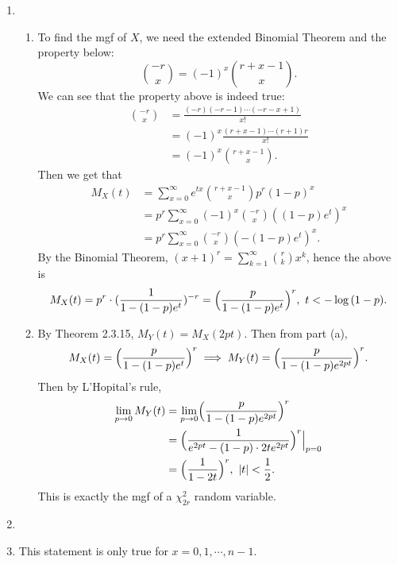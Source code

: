 \documentclass{article}
\begin{document}
\begin{enumerate}
    \item \begin{enumerate}
        \item To find the mgf of $X$, we need the extended Binomial Theorem and the property below: 
        \[ \binom{-r}{x} = (-1)^x \binom{r + x - 1}{x}. \]
        We can see that the property above is indeed true: 
        \begin{align*}
            \binom{-r}{x} 
            &= \frac{(-r)(-r-1)\cdots(-r - x + 1)}{x!} \\
            &= (-1)^x \frac{(r + x - 1)\cdots(r + 1)r}{x!} \\
            &= (-1)^x \binom{r + x - 1}{x}.
        \end{align*}
        Then we get that 
        \begin{align*}
            M_X(t) 
            &= \sum_{x = 0}^{\infty} e^{tx} \binom{r + x - 1}{x} p^r (1 - p)^x \\
            &= p^r \sum_{x = 0}^{\infty} (-1)^x \binom{-r}{x} ((1 - p)e^t)^x \\
            &= p^r \sum_{x = 0}^{\infty} \binom{-r}{x} (-(1 - p)e^t)^x.
        \end{align*}
        By the Binomial Theorem, $(x + 1)^r = \sum_{k = 1}^{\infty} \binom{r}{k} x^k$, hence the above is 
        \[ M_X(t) = p^r \cdot (\frac{1}{1 - (1 - p)e^t})^{-r} 
        = \Bigl( \frac{p}{1 - (1 - p)e^t} \Bigr)^r, \ t < -\log{(1 - p)}. \]

        \item By Theorem 2.3.15, $M_Y(t) = M_X(2pt)$. Then from part (a), 
        \[ M_X(t) = \Bigl( \frac{p}{1 - (1 - p)e^t} \Bigr)^r 
        \implies M_Y(t) = \Bigl( \frac{p}{1 - (1 - p)e^{2pt}} \Bigr)^r. \]
        Then by L'Hopital's rule, 
        \begin{align*}
            \lim_{p \to 0} M_Y(t) 
            &= \lim_{p \to 0} \Bigl( \frac{p}{1 - (1 - p)e^{2pt}} \Bigr)^r \\
            &= \Bigl( \frac{1}{e^{2pt} - (1 - p) \cdot 2te^{2pt}} \Bigr)^r \Big|_{p = 0} \\
            &= \Bigl( \frac{1}{1 - 2t} \Bigr)^r, \ |t| < \frac{1}{2}.
        \end{align*}
        This is exactly the mgf of a $\chi^2_{2r}$ random variable.
    \end{enumerate}

    \item 
    
    \item This statement is only true for $x = 0, 1, \cdots, n - 1$.

\end{enumerate}
\end{document}
